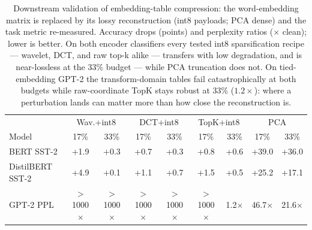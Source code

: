 \begin{table}[t]
\centering
\small
\caption{Downstream validation of embedding-table
compression: the word-embedding matrix is replaced by its
lossy reconstruction (int8 payloads; PCA dense) and the task
metric re-measured. Accuracy drops (points) and perplexity
ratios ($\times$ clean); lower is better. On both encoder
classifiers every tested int8 sparsification recipe --- wavelet,
DCT, and raw top-k alike --- transfers with low degradation, and
is near-lossless at the 33\% budget --- while PCA
truncation does not. On tied-embedding GPT-2 the transform-domain
tables fail catastrophically at both budgets while raw-coordinate
TopK stays robust at 33\% ($1.2\times$): where a perturbation
lands can matter more than how close the reconstruction is.}
\label{tab:dscomp}
\begin{tabular}{lcccccccc}
\toprule
 & \multicolumn{2}{c}{Wav.+int8} & \multicolumn{2}{c}{DCT+int8} & \multicolumn{2}{c}{TopK+int8} & \multicolumn{2}{c}{PCA} \\
Model & 17\% & 33\% & 17\% & 33\% & 17\% & 33\% & 17\% & 33\% \\
\midrule
BERT SST-2 & +1.9 & +0.3 & +0.7 & +0.3 & +0.8 & +0.6 & +39.0 & +36.0 \\
DistilBERT SST-2 & +4.9 & +0.1 & +1.1 & +0.7 & +1.5 & +0.5 & +25.2 & +17.1 \\
GPT-2 PPL & $>$1000$\times$ & $>$1000$\times$ & $>$1000$\times$ & $>$1000$\times$ & $>$1000$\times$ & 1.2$\times$ & 46.7$\times$ & 21.6$\times$ \\
\bottomrule
\end{tabular}
\end{table}
